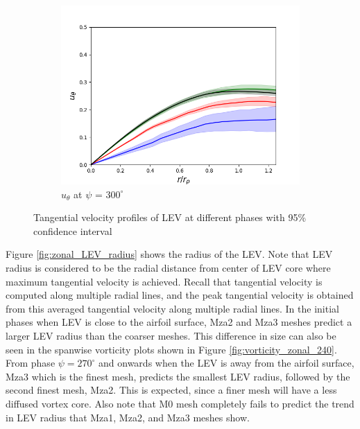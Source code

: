\begin{figure}[H]
\begin{subfigure}[b]{0.475\textwidth}
	\centering
	\includegraphics[width=1\textwidth]{figures/zonal_adapt_results/LEV/u_theta/phase_300.png}
	\caption{ $u_\theta$ at $\psi$ = $300^\circ$}
	\label{fig:zonal_utheta_300}
	\end{subfigure}
    \label{fig:zonal_utheta_LEV}
   	\caption{Tangential velocity profiles of LEV at different phases with 95\% confidence interval}
\end{figure}


Figure \ref{fig:zonal_LEV_radius} shows the radius of the LEV. Note that LEV radius is considered to be the radial distance from center of LEV core where maximum tangential velocity is achieved.
Recall that tangential velocity is computed along multiple radial lines, and the peak tangential velocity is obtained from this averaged tangential velocity along multiple radial lines. 
In the initial phases when LEV is close to the airfoil surface, Mza2 and Mza3 meshes predict a larger LEV radius than the coarser meshes. 
This difference in size can also be seen in the spanwise vorticity plots shown in Figure \ref{fig:vorticity_zonal_240}.
From phase $\psi = 270^\circ$ and onwards when the LEV is away from the airfoil surface, Mza3 which is the finest mesh, predicts the smallest LEV radius, followed by the second finest mesh, Mza2. 
This is expected, since a finer mesh will have a less diffused vortex core. Also note that M0 mesh completely fails to predict the trend in LEV radius that Mza1, Mza2, and Mza3 meshes show.

